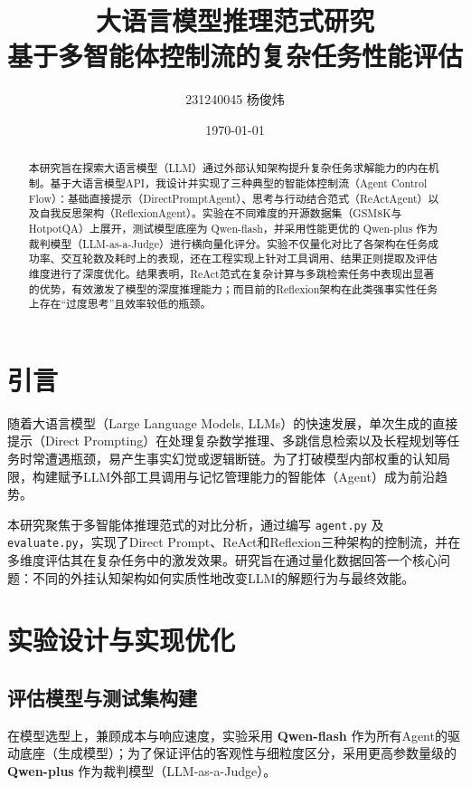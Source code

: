 \documentclass[11pt,a4paper]{ctexart}
\title{\vspace{-2cm}\textbf{\huge 大语言模型推理范式研究}\\[0.5cm] \Large 基于多智能体控制流的复杂任务性能评估}
\author{231240045 杨俊炜}
\date{\today}
\begin{document}
\maketitle
\thispagestyle{empty}

\begin{abstract}
\noindent 本研究旨在探索大语言模型（LLM）通过外部认知架构提升复杂任务求解能力的内在机制。基于大语言模型API，我设计并实现了三种典型的智能体控制流（Agent Control Flow）：基础直接提示（DirectPromptAgent）、思考与行动结合范式（ReActAgent）以及自我反思架构（ReflexionAgent）。实验在不同难度的开源数据集（GSM8K与HotpotQA）上展开，测试模型底座为 Qwen-flash，并采用性能更优的 Qwen-plus 作为裁判模型（LLM-as-a-Judge）进行横向量化评分。实验不仅量化对比了各架构在任务成功率、交互轮数及耗时上的表现，还在工程实现上针对工具调用、结果正则提取及评估维度进行了深度优化。结果表明，ReAct范式在复杂计算与多跳检索任务中表现出显著的优势，有效激发了模型的深度推理能力；而目前的Reflexion架构在此类强事实性任务上存在“过度思考”且效率较低的瓶颈。
\end{abstract}

\vspace{1cm}

\section{引言}
随着大语言模型（Large Language Models, LLMs）的快速发展，单次生成的直接提示（Direct Prompting）在处理复杂数学推理、多跳信息检索以及长程规划等任务时常遭遇瓶颈，易产生事实幻觉或逻辑断链。为了打破模型内部权重的认知局限，构建赋予LLM外部工具调用与记忆管理能力的智能体（Agent）成为前沿趋势。

本研究聚焦于多智能体推理范式的对比分析，通过编写 \verb|agent.py| 及 \verb|evaluate.py|，实现了Direct Prompt、ReAct和Reflexion三种架构的控制流，并在多维度评估其在复杂任务中的激发效果。研究旨在通过量化数据回答一个核心问题：不同的外挂认知架构如何实质性地改变LLM的解题行为与最终效能。

\section{实验设计与实现优化}

\subsection{评估模型与测试集构建}
在模型选型上，兼顾成本与响应速度，实验采用 \textbf{Qwen-flash} 作为所有Agent的驱动底座（生成模型）；为了保证评估的客观性与细粒度区分，采用更高参数量级的 \textbf{Qwen-plus} 作为裁判模型（LLM-as-a-Judge）。
\end{document}
